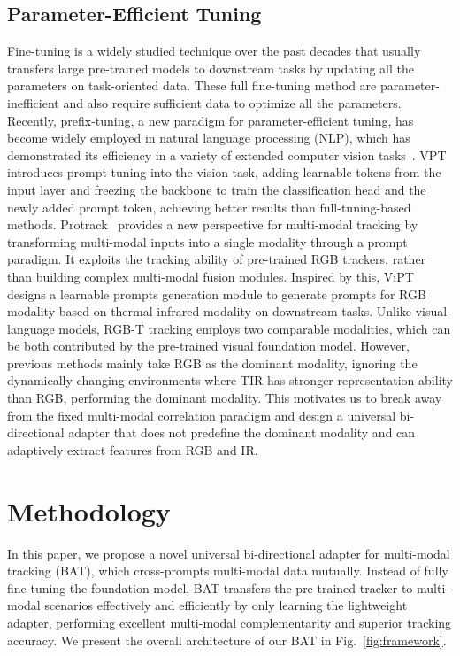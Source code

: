 \documentclass[letterpaper]{article} %
\begin{document}
\subsection{Parameter-Efficient Tuning}
Fine-tuning is a widely studied technique over the past decades that usually transfers large pre-trained models to downstream tasks by updating all the parameters on task-oriented data.
These full fine-tuning method are parameter-inefficient and also require sufficient data to optimize all the parameters.
Recently, prefix-tuning, a new paradigm for parameter-efficient tuning, has become widely employed in natural language processing (NLP), which has demonstrated its efficiency in a variety of extended computer vision tasks~\cite{khattak2023maple}.
VPT~\cite{jia2022visual} introduces prompt-tuning into the vision task, adding learnable tokens from the input layer and freezing the backbone to train the classification head and the newly added prompt token, achieving better results than full-tuning-based methods.
Protrack~\cite{ProTrack} provides a new perspective for multi-modal tracking by transforming multi-modal inputs into a single modality through a prompt paradigm. It exploits the tracking ability of pre-trained RGB trackers, rather than building complex multi-modal fusion modules.
Inspired by this, ViPT~\cite{zhu2023visual} designs a learnable prompts generation module to generate prompts for RGB modality based on thermal infrared modality on downstream tasks.
Unlike visual-language models, RGB-T tracking employs two comparable modalities, which can be both contributed by the pre-trained visual foundation model. However, previous methods mainly take RGB as the dominant modality, ignoring the dynamically changing environments where TIR has stronger representation ability than RGB, performing the dominant modality.
This motivates us to break away from the fixed multi-modal correlation paradigm and design a universal bi-directional adapter that does not predefine the dominant modality and can adaptively extract features from RGB and IR.



\section{Methodology}
In this paper, we propose a novel universal bi-directional adapter for multi-modal tracking (BAT), which cross-prompts multi-modal data mutually.
Instead of fully fine-tuning the foundation model, BAT transfers the pre-trained tracker to multi-modal scenarios effectively and efficiently by only learning the lightweight adapter, performing excellent multi-modal complementarity and superior tracking accuracy.
We present the overall architecture of our BAT in Fig.~\ref{fig:framework}.
\end{document}
